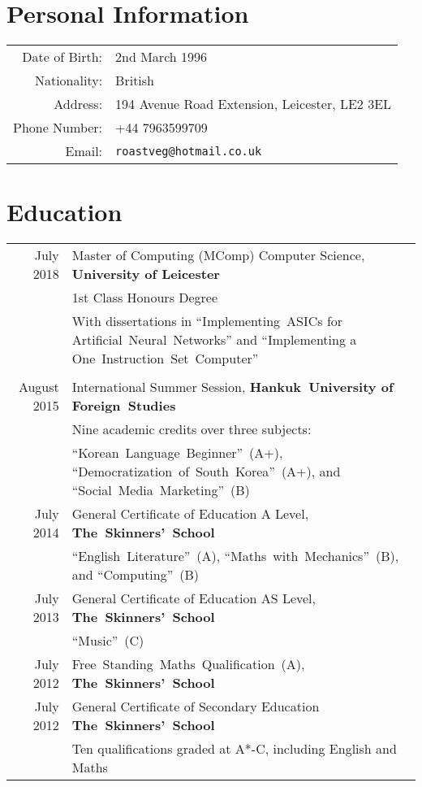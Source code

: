 \documentclass[a4paper]{article}
\begin{document}
\pagestyle{empty}
\par{ \par}

\section*{Personal Information}
\begin{tabular}{rl}
  Date of Birth: & 2nd March 1996 \\
  Nationality: & British \\
  Address: & 194 Avenue Road Extension, Leicester, LE2 3EL \\
  Phone Number: & +44 7963599709 \\
  Email: & \texttt{roastveg@hotmail.co.uk}
\end{tabular}

\section*{Education}
\begin{tabular}{rp{11.75cm}}
  July 2018 & Master of Computing (MComp) Computer Science, \textbf{University of Leicester} \\
  & 1st Class Honours Degree \\
  & With dissertations in ``Implementing~ASICs for Artificial~Neural~Networks'' and ``Implementing a One~Instruction~Set~Computer'' \\
  \multicolumn{2}{c}{} \\
  
  August 2015 & International Summer Session, \textbf{Hankuk~University of Foreign~Studies} \\
  & Nine academic credits over three subjects: \\
  & ``Korean~Language~Beginner''~(A+), ``Democratization~of~South~Korea''~(A+), and ``Social~Media~Marketing''~(B) \\
  
  July 2014 & General Certificate of Education A Level, \textbf{The~Skinners'~School} \\
  & ``English~Literature''~(A), ``Maths~with~Mechanics''~(B), and ``Computing''~(B) \\
  July 2013 & General Certificate of Education AS Level, \textbf{The~Skinners'~School} \\
  & ``Music''~(C) \\
  July 2012 & Free~Standing~Maths~Qualification~(A), \textbf{The~Skinners'~School} \\
  July 2012 & General Certificate of Secondary Education \textbf{The~Skinners'~School} \\
  & Ten qualifications graded at A*-C, including English and Maths
\end{tabular}
\end{document}
